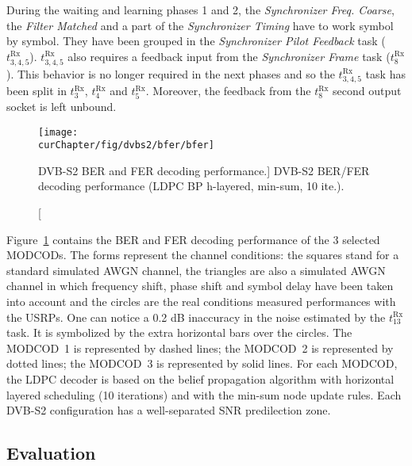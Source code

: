 During the waiting and learning phases 1 and 2, the \emph{Synchronizer Freq.
Coarse}, the \emph{Filter Matched} and a part of the \emph{Synchronizer Timing}
have to work symbol by symbol. They have been grouped in the \emph{Synchronizer
Pilot Feedback} task ($t^\text{Rx}_{3,4,5}$). $t^\text{Rx}_{3,4,5}$ also
requires a feedback input from the \emph{Synchronizer Frame} task
($t^\text{Rx}_8$). This behavior is no longer required in the next phases and so
the $t^\text{Rx}_{3,4,5}$ task has been split in $t^\text{Rx}_3$,
$t^\text{Rx}_4$ and $t^\text{Rx}_5$. Moreover, the feedback from the
$t^\text{Rx}_8$ second output socket is left unbound.

\begin{figure}[htp]
  \centering
  \texttt{[image: \\curChapter/fig/dvbs2/bfer/bfer]}
  \caption
    [DVB-S2 BER and FER decoding performance.]
    {DVB-S2 BER/FER decoding performance (LDPC BP h-layered, min-sum, 10 ite.).}
  \label{fig:dvbs2_bfer}
\end{figure}

Figure~\ref{fig:dvbs2_bfer} contains the BER and FER decoding performance of the
3 selected MODCODs. The forms represent the channel conditions: the squares
stand for a standard simulated AWGN channel, the triangles are also a simulated
AWGN channel in which frequency shift, phase shift and symbol delay have been
taken into account and the circles are the real conditions measured performances
with the USRPs. One can notice a 0.2 dB inaccuracy in the noise estimated by the
$t^\text{Rx}_{13}$ task. It is symbolized by the extra horizontal bars over
the circles. The {\color{Paired-1} MODCOD~1} is represented by dashed lines; the
{\color{Paired-3} MODCOD~2} is represented by dotted lines; the
{\color{Paired-5} MODCOD~3} is represented by solid lines. For each MODCOD, the
LDPC decoder is based on the belief propagation algorithm with horizontal
layered scheduling (10 iterations) and with the min-sum node update rules. Each
DVB-S2 configuration has a well-separated SNR predilection zone.

\subsection{Evaluation}

